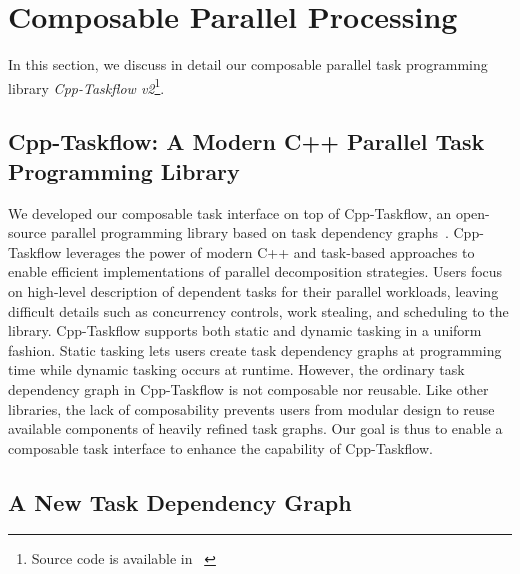 \documentclass[conference]{IEEEtran}
\begin{document}
\section{Composable Parallel Processing}

In this section, we discuss in detail our composable parallel task programming library
\textit{Cpp-Taskflow v2}\footnote{Source code is available in ~\cite{Cpp-Taskflow}}.
% 
 

\subsection{Cpp-Taskflow: A Modern C++ Parallel Task Programming Library}

We developed our composable task interface on top of Cpp-Taskflow,
an open-source parallel programming library based on task dependency graphs~\cite{Huang_19_01}. 
Cpp-Taskflow %
leverages the power of modern C++ and task-based approaches to enable
efficient implementations of parallel decomposition strategies.
Users focus on high-level description of dependent tasks for their parallel workloads,
leaving difficult details such as concurrency controls,
work stealing, and scheduling to the library.
Cpp-Taskflow supports both static and dynamic tasking in a uniform fashion. 
Static tasking lets users create task dependency graphs at programming time
while dynamic tasking occurs at runtime.
However, the ordinary task dependency graph in Cpp-Taskflow is not composable nor reusable.
Like other libraries, 
the lack of composability prevents users from modular design
to reuse available components of heavily refined task graphs.
Our goal is thus to enable a composable task interface
to enhance the capability of Cpp-Taskflow.


\subsection{A New Task Dependency Graph}
\end{document}
